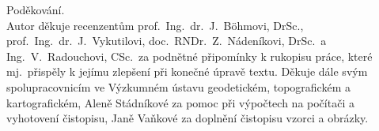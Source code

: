\noindent Poděkování.\\[-1em]

Autor děkuje recenzentům prof.\ Ing.\ dr.\ J.\ Böhmovi, DrSc.,
prof.\ Ing.\ dr.\ J.\ Vykutilovi, doc.\ RNDr.\ Z.\ Nádeníkovi, DrSc.\ a
Ing.\ V.\ Radouchovi, CSc.\ za podnětné připomínky k rukopisu
práce, které mj.\ přispěly k jejímu zlepšení při konečné úpravě
textu. Děkuje dále svým spolupracovnicím ve Výzkumném
ústavu geodetickém, topografickém a kartografickém,
Aleně Stádníkové za pomoc při výpočtech na počítači a vyhotovení
čistopisu, Janě Vaňkové za doplnění čistopisu vzorci a obrázky.
